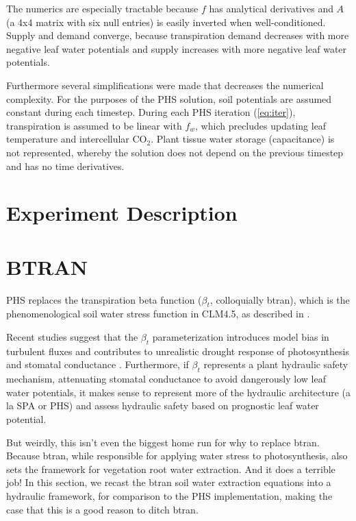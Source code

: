 \documentclass[draft,linenumbers]{agujournal}
\begin{document}
    The numerics are especially tractable because $f$ has analytical derivatives and $A$ 
    (a 4x4 matrix with six null entries) is easily inverted when well-conditioned. 
    Supply and demand converge, because transpiration demand decreases with more negative 
    leaf water potentials and supply increases with more negative leaf water potentials.
    
    Furthermore several simplifications were made that decreases the numerical complexity.
    For the purposes of the PHS solution, soil potentials are assumed constant during each timestep.
    During each PHS iteration (\ref{eq:iter}), transpiration is assumed to be linear with $f_w$,
    which precludes updating leaf temperature and intercellular CO$_2$.
    Plant tissue water storage (capacitance) is not represented, whereby the solution does not
    depend on the previous timestep and has no time derivatives.

\section{Experiment Description}
    
    
    

\section{BTRAN}
\label{sect:btran}
    PHS replaces the transpiration beta function ($\beta_t$, colloquially btran), 
    which is the phenomenological soil water stress function in CLM4.5,
    as described in \citet{oleson2013,sellers1996a,sellers1996b}.
    
    Recent studies suggest that the $\beta_t$ parameterization introduces model bias in turbulent fluxes \citep{bonan2014}
    and contributes to unrealistic drought response of photosynthesis and stomatal conductance  \citep{powell2013}.
    Furthermore, if $\beta_t$ represents a plant hydraulic safety mechanism, attenuating stomatal conductance to avoid
    dangerously low leaf water potentials, it makes sense to represent more of the hydraulic architecture (a la SPA or PHS)
    and assess hydraulic safety based on prognostic leaf water potential.
    
    But weirdly, this isn't even the biggest home run for why to replace btran. Because btran, while responsible for applying
    water stress to photosynthesis, also sets the framework for vegetation root water extraction. And it does a terrible job!
    In this section, we recast the btran soil water extraction equations into a hydraulic framework, for comparison to the PHS implementation, making the case that this is a good reason to ditch btran.
    
\end{document}
